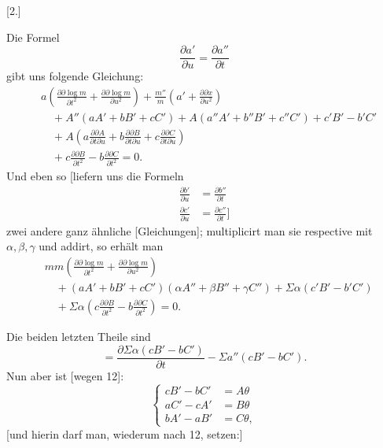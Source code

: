 %
\begin{center}[2.]\end{center}
\noindent\hspace*{1.2em} Die Formel
\[
\frac{\partial a'}{\partial u}=\frac{\partial a''}{\partial t}
\]
gibt uns folgende Gleichung:
\[
\begin{aligned}
&a\left(\frac{\partial\partial\log m}{\partial t^2}+\frac{\partial\partial\log m}{\partial u^2}\right)+\frac{m''}m\left(a'+\frac{\partial\partial x}{\partial u^2}\right)\\
&\quad+A''(aA'+bB'+cC')+A(a''A'+b''B'+c''C')+c'B'-b'C'\\
&\quad+A\left(a\frac{\partial\partial A}{\partial t\partial u}+b\frac{\partial\partial B}{\partial t\partial u}+c\frac{\partial\partial C}{\partial t\partial u}\right)\\
&\quad+c\frac{\partial\partial B}{\partial t^2}-b\frac{\partial\partial C}{\partial t^2}=0.
\end{aligned}
\]
Und eben so [liefern uns die Formeln
\[
\begin{aligned}
\frac{\partial b'}{\partial u}&=\frac{\partial b''}{\partial t}\\
\frac{\partial c'}{\partial u}&=\frac{\partial c''}{\partial t}]
\end{aligned}
\]
zwei andere ganz ähnliche [Gleichungen]; multiplicirt man sie respective mit $\alpha,\beta,\gamma$ und addirt, so erhält man
\[
\begin{aligned}
&mm\left(\frac{\partial\partial\log m}{\partial t^2}+\frac{\partial\partial\log m}{\partial u^2}\right)\\
&\quad+(aA'+bB'+cC')(\alpha A''+\beta B''+\gamma C'')+\Sigma\alpha(c'B'-b'C')\\
&\quad+\Sigma\alpha\left(c\frac{\partial\partial B}{\partial t^2}-b\frac{\partial\partial C}{\partial t^2}\right)=0.
\end{aligned}
\]
\par\indent Die beiden letzten Theile sind
\[
=\frac{\partial\Sigma\alpha(cB'-bC')}{\partial t}-\Sigma a''(cB'-bC').
\]
Nun aber ist [wegen 12]:
\begin{equation}\tag*{[23]}
\left\{\begin{aligned}
cB'-bC'&=A\theta\\
aC'-cA'&=B\theta\\
bA'-aB'&=C\theta,
\end{aligned}\right.
\end{equation}
[und hierin darf man, wiederum nach 12, setzen:]
